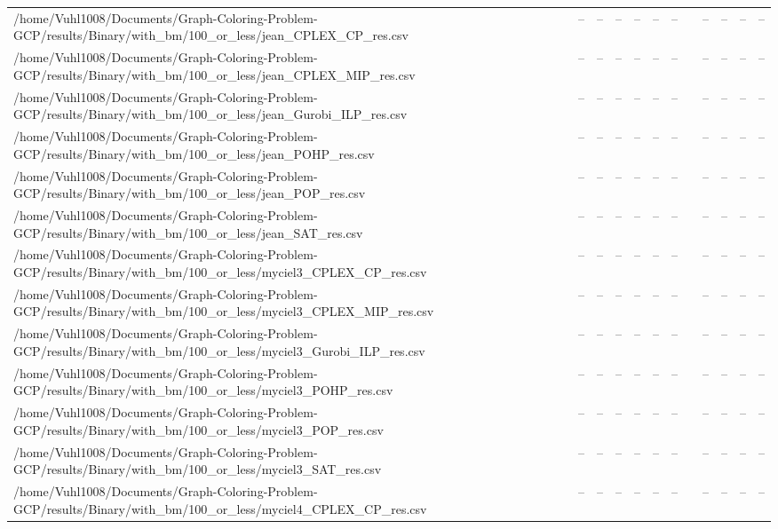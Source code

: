\begin{table}[htbp]
\begin{tabular}{llllllllllll}
/home/Vuhl1008/Documents/Graph-Coloring-Problem-GCP/results/Binary/with\_bm/100\_or\_less/jean\_CPLEX\_CP\_res.csv & -- & -- & -- & -- & -- & -- & {} & -- & -- & -- & -- \\
/home/Vuhl1008/Documents/Graph-Coloring-Problem-GCP/results/Binary/with\_bm/100\_or\_less/jean\_CPLEX\_MIP\_res.csv & -- & -- & -- & -- & -- & -- & {} & -- & -- & -- & -- \\
/home/Vuhl1008/Documents/Graph-Coloring-Problem-GCP/results/Binary/with\_bm/100\_or\_less/jean\_Gurobi\_ILP\_res.csv & -- & -- & -- & -- & -- & -- & {} & -- & -- & -- & -- \\
/home/Vuhl1008/Documents/Graph-Coloring-Problem-GCP/results/Binary/with\_bm/100\_or\_less/jean\_POHP\_res.csv & -- & -- & -- & -- & -- & -- & {} & -- & -- & -- & -- \\
/home/Vuhl1008/Documents/Graph-Coloring-Problem-GCP/results/Binary/with\_bm/100\_or\_less/jean\_POP\_res.csv & -- & -- & -- & -- & -- & -- & {} & -- & -- & -- & -- \\
/home/Vuhl1008/Documents/Graph-Coloring-Problem-GCP/results/Binary/with\_bm/100\_or\_less/jean\_SAT\_res.csv & -- & -- & -- & -- & -- & -- & {} & -- & -- & -- & -- \\
/home/Vuhl1008/Documents/Graph-Coloring-Problem-GCP/results/Binary/with\_bm/100\_or\_less/myciel3\_CPLEX\_CP\_res.csv & -- & -- & -- & -- & -- & -- & {} & -- & -- & -- & -- \\
/home/Vuhl1008/Documents/Graph-Coloring-Problem-GCP/results/Binary/with\_bm/100\_or\_less/myciel3\_CPLEX\_MIP\_res.csv & -- & -- & -- & -- & -- & -- & {} & -- & -- & -- & -- \\
/home/Vuhl1008/Documents/Graph-Coloring-Problem-GCP/results/Binary/with\_bm/100\_or\_less/myciel3\_Gurobi\_ILP\_res.csv & -- & -- & -- & -- & -- & -- & {} & -- & -- & -- & -- \\
/home/Vuhl1008/Documents/Graph-Coloring-Problem-GCP/results/Binary/with\_bm/100\_or\_less/myciel3\_POHP\_res.csv & -- & -- & -- & -- & -- & -- & {} & -- & -- & -- & -- \\
/home/Vuhl1008/Documents/Graph-Coloring-Problem-GCP/results/Binary/with\_bm/100\_or\_less/myciel3\_POP\_res.csv & -- & -- & -- & -- & -- & -- & {} & -- & -- & -- & -- \\
/home/Vuhl1008/Documents/Graph-Coloring-Problem-GCP/results/Binary/with\_bm/100\_or\_less/myciel3\_SAT\_res.csv & -- & -- & -- & -- & -- & -- & {} & -- & -- & -- & -- \\
/home/Vuhl1008/Documents/Graph-Coloring-Problem-GCP/results/Binary/with\_bm/100\_or\_less/myciel4\_CPLEX\_CP\_res.csv & -- & -- & -- & -- & -- & -- & {} & -- & -- & -- & -- \\

\end{tabular}
\end{table}
